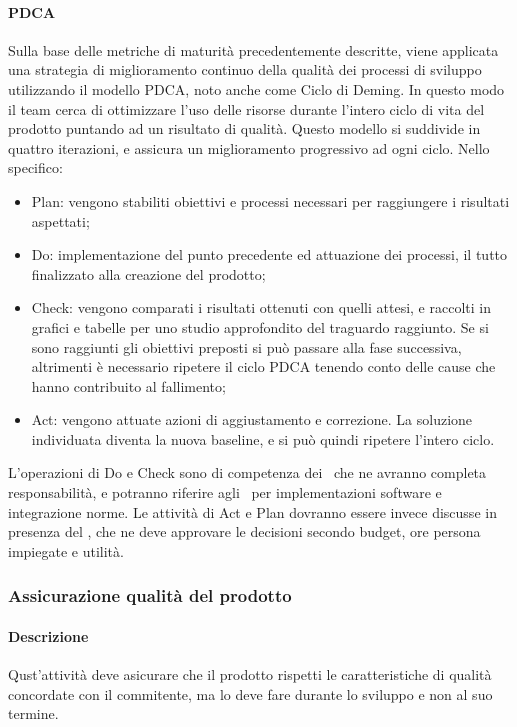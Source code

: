\documentclass[../NormeDiProgetto_v3.0.0.tex]{subfiles}
\begin{document}
					\paragraph{PDCA}
					Sulla base delle metriche di maturità precedentemente descritte, viene applicata una strategia di miglioramento continuo della qualità dei processi di sviluppo utilizzando il modello PDCA, noto anche come Ciclo di Deming. In questo modo il team cerca di ottimizzare l'uso delle risorse durante l'intero ciclo di vita del prodotto puntando ad un risultato di qualità. Questo modello si suddivide in quattro iterazioni, e assicura un miglioramento progressivo ad ogni ciclo. Nello specifico: 
					\begin{itemize}
						\item Plan: vengono stabiliti obiettivi e processi necessari per raggiungere i risultati aspettati;
						\item Do: implementazione del punto precedente ed attuazione dei processi, il tutto finalizzato alla creazione del prodotto;
						\item Check: vengono comparati i risultati ottenuti con quelli attesi, e raccolti in grafici e tabelle per uno studio approfondito del traguardo raggiunto. Se si sono raggiunti gli obiettivi preposti si può passare alla fase successiva, altrimenti è necessario ripetere il ciclo PDCA tenendo conto delle cause che hanno contribuito al fallimento;
						\item Act: vengono attuate azioni di aggiustamento e correzione. La soluzione individuata diventa la nuova baseline, e si può quindi ripetere l'intero ciclo.
					\end{itemize}
					L'operazioni di Do e Check sono di competenza dei \verificatori\ che ne avranno completa responsabilità, e potranno riferire agli \amministratori\ per implementazioni software e integrazione norme.
					Le attività di Act e Plan dovranno essere invece discusse in presenza del \responsabilediprogetto, che ne deve approvare le decisioni secondo budget, ore persona impiegate e utilità.
			
			\subsubsection{Assicurazione qualità del prodotto}
				\paragraph{Descrizione}
					Qust'attività deve asicurare che il prodotto rispetti le caratteristiche di qualità concordate con il commitente, ma lo deve fare durante lo sviluppo e non al suo termine.
\end{document}
